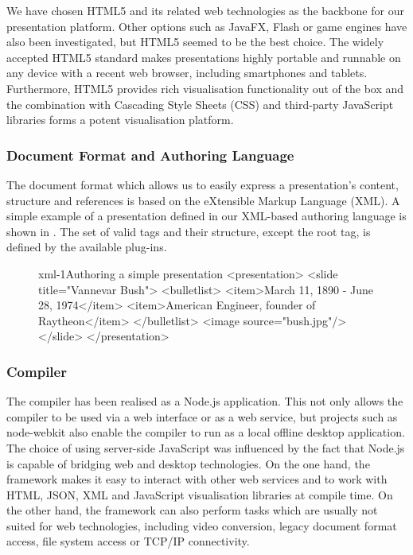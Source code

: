     We have chosen HTML5 and its related web technologies as the backbone for
    our \mxp presentation platform. Other options such as JavaFX, Flash or game
    engines have also been investigated, but HTML5 seemed to be the best choice.
    The widely accepted HTML5 standard makes \mxp presentations highly portable and
    runnable on any device with a recent web browser, including smartphones and
    tablets. Furthermore, HTML5 provides rich visualisation functionality out of
    the box and the combination with Cascading Style Sheets
    (CSS) and third-party JavaScript libraries forms a potent visualisation
    platform.

    \subsubsection{Document Format and Authoring Language}

     The \mxp document format which allows us to easily express a
     presentation's content, structure and references is based on the
     eXtensible Markup Language (XML). A simple example of a presentation
     defined in our XML-based authoring language is shown in .
     The set of valid tags and their structure, except the 
     root tag, is defined by the available plug-ins.

     \begin{figure}[h!]
      \begin{lstxml}{xml-1}{Authoring a simple \mxp presentation}
<presentation>
  <slide title="Vannevar Bush">
    <bulletlist>
      <item>March 11, 1890 - June 28, 1974</item>
      <item>American Engineer, founder of Raytheon</item>
    </bulletlist>
    <image source="bush.jpg"/>
  </slide>
</presentation>
      \end{lstxml}
     \end{figure}

    \subsubsection{Compiler}

     The compiler has been realised as a Node.js application. This not only
     allows the compiler to be used via a web interface or as a web service,
     but projects such as node-webkit also enable the compiler to run as a
     local offline desktop application. The choice of using server-side
     JavaScript was influenced by the fact that Node.js is capable of bridging
     web and desktop technologies. On the one hand, the framework makes it easy
     to interact with other web services and to work with HTML, JSON, XML and
     JavaScript visualisation libraries at compile time. On the other hand, the
     framework can also perform tasks which are usually not suited for web
     technologies, including video conversion, legacy document format access,
     file system access or TCP/IP connectivity.


